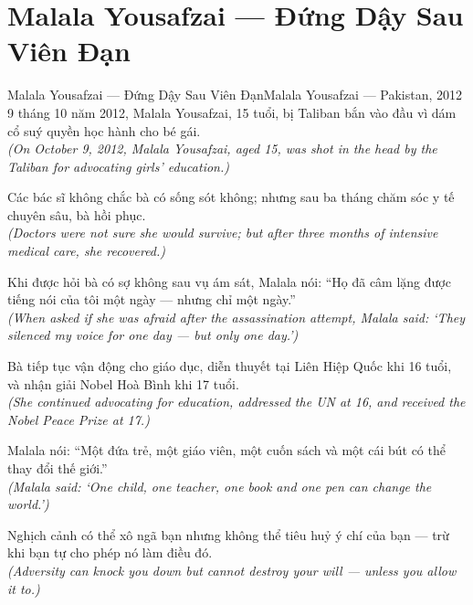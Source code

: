\section{Malala Yousafzai --- Đứng Dậy Sau Viên Đạn}
\begin{truyen}{Malala Yousafzai --- Đứng Dậy Sau Viên Đạn}{Malala Yousafzai --- Pakistan, 2012}
 9 tháng 10 năm 2012, Malala Yousafzai, 15 tuổi, bị Taliban bắn vào đầu vì dám cổ suý quyền học hành cho bé gái.\\[4pt]
\textit{(On October 9, 2012, Malala Yousafzai, aged 15, was shot in the head by the Taliban for advocating girls' education.)}

Các bác sĩ không chắc bà có sống sót không; nhưng sau ba tháng chăm sóc y tế chuyên sâu, bà hồi phục.\\[4pt]
\textit{(Doctors were not sure she would survive; but after three months of intensive medical care, she recovered.)}

Khi được hỏi bà có sợ không sau vụ ám sát, Malala nói: ``Họ đã câm lặng được tiếng nói của tôi một ngày --- nhưng chỉ một ngày.''\\[4pt]
\textit{(When asked if she was afraid after the assassination attempt, Malala said: `They silenced my voice for one day --- but only one day.')}

Bà tiếp tục vận động cho giáo dục, diễn thuyết tại Liên Hiệp Quốc khi 16 tuổi, và nhận giải Nobel Hoà Bình khi 17 tuổi.\\[4pt]
\textit{(She continued advocating for education, addressed the UN at 16, and received the Nobel Peace Prize at 17.)}

Malala nói: ``Một đứa trẻ, một giáo viên, một cuốn sách và một cái bút có thể thay đổi thế giới.''\\[4pt]
\textit{(Malala said: `One child, one teacher, one book and one pen can change the world.')}

\end{truyen}
\begin{baihoc}
  Nghịch cảnh có thể xô ngã bạn nhưng không thể tiêu huỷ ý chí của bạn --- trừ khi bạn tự cho phép nó làm điều đó.\\[4pt]
  \textit{(Adversity can knock you down but cannot destroy your will --- unless you allow it to.)}
\end{baihoc}

